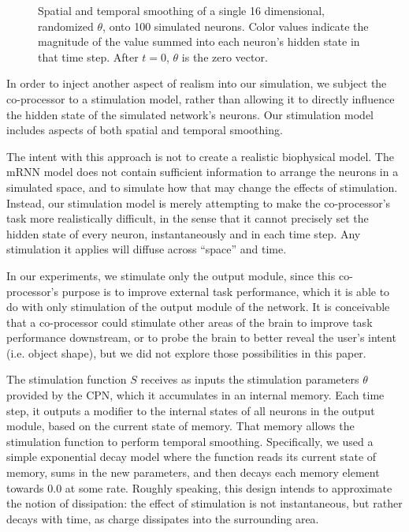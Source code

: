 \documentclass[12pt]{iopart}
\begin{document}
\begin{figure}[h]
	\caption{Spatial and temporal smoothing of a single 16 dimensional,
	         randomized $\theta$, onto 100 simulated neurons.
		 Color values indicate the magnitude of the value summed into
		 each neuron's hidden state in that time step. After $t=0$,
		 $\theta$ is the zero vector.}
	\label{fig:stim_single}
\end{figure}

In order to inject another aspect of realism into our simulation, we subject
the co-processor to a stimulation model, rather than allowing it to directly
influence the hidden state of the simulated network's neurons. Our stimulation
model includes aspects of both spatial and temporal smoothing.

The intent with this approach is not to create a realistic biophysical model. The
mRNN model does not contain sufficient information to arrange the neurons in a
simulated space, and to simulate how that may change the effects of stimulation.
Instead, our stimulation model is merely attempting to make the co-processor's task
more realistically difficult, in the sense that it cannot precisely set the hidden
state of every neuron, instantaneously and in each time step. Any stimulation it
applies will diffuse across ``space'' and time.

In our experiments, we stimulate only the output module, since this co-processor's
purpose is to improve external task performance, which it is able to do with
only stimulation of the output module of the network. It is conceivable that
a co-processor could stimulate other areas of the brain to improve task performance
downstream, or to probe the brain to better reveal the user's intent (i.e. object
shape), but we did not explore those possibilities in this paper.

The stimulation function $S$ receives as inputs the stimulation parameters $\theta$
provided by the CPN, which it accumulates in an internal memory. Each time step,
it outputs a modifier to the internal states of all neurons in the output module,
based on the current state of memory. That memory allows
the stimulation function to perform temporal smoothing. Specifically, we used a
simple exponential decay model where the function reads its current state of memory,
sums in the new parameters, and then decays each memory element towards $0.0$ at some
rate. Roughly speaking, this design intends to approximate the notion of dissipation: the
effect of stimulation is not instantaneous, but rather decays with time, as charge
dissipates into the surrounding area.
\end{document}

